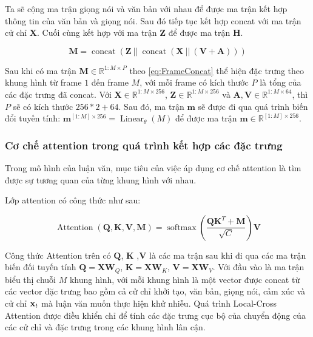 Ta sẽ cộng ma trận giọng nói và văn bản với nhau để được ma trận kết hợp thông tin của văn bản và giọng nói. Sau đó tiếp tục kết hợp concat với ma trận cử chỉ $\mathbf{X}$. Cuối cùng kết hợp với ma trận $\mathbf{Z}$ để được ma trận $\mathbf{H}$.

\begin{equation}
	\label{eq:FrameConcat}
	\mathbf{M} = \operatorname{concat}( \mathbf{Z}\  || \   \operatorname{concat}(\mathbf{X}\ || \  (\mathbf{V} + \mathbf{A}) ) )
\end{equation}

Sau khi có ma trận $\mathbf{M} \in \mathbb{R}^{1:M \times P}$ theo \autoref{eq:FrameConcat} thể hiện đặc trưng theo khung hình từ frame $1$ đến frame $M$, với mỗi frame có kích thước $P$ là tổng của các đặc trưng đã concat. Với $\mathbf{X} \in \mathbb{R}^{1:M \times 256}$, $\mathbf{Z} \in \mathbb{R}^{1:M \times 256}$ và $\mathbf{A}, \mathbf{V} \in \mathbb{R}^{1:M \times 64}$, thì $P$ sẽ có kích thước $256 * 2 + 64$. Sau đó, ma trận $\mathbf{m}$ sẽ được đi qua quá trình biến đổi tuyến tính: $\mathbf{m}^{[1:M] \times 256} = \operatorname{Linear}_{\theta}(M)$ để được ma trận $\mathbf{m} \in \mathbb{R}^{[1:M] \times 256}$.

\subsubsection{Cơ chế attention trong quá trình kết hợp các đặc trưng}

Trong mô hình của luận văn, mục tiêu của việc áp dụng cơ chế attention là tìm được sự tương quan của từng khung hình với nhau.

Lớp attention có công thức như sau:

\begin{equation} \label{eq:attention}
	\operatorname{Attention}(\mathbf{Q}, \mathbf{K}, \mathbf{V}, \mathbf{M})=\operatorname{softmax}\left(\frac{\mathbf{Q} \mathbf{K}^{T}+\mathbf{M}}{\sqrt{C}}\right) \mathbf{V}
\end{equation}

Công thức Attention trên có $\mathbf{Q}$, $\mathbf{K}$ ,$\mathbf{V}$ là các ma trận sau khi đi qua các ma trận biến đối tuyến tính $\mathbf{Q} = \mathbf{X} \mathbf{W}_Q$, $\mathbf{K} = \mathbf{X} \mathbf{W}_K$, $\mathbf{V} = \mathbf{X} \mathbf{W}_V$. Với đầu vào là ma trận biểu thị chuỗi $M$ khung hình, với mỗi khung hình là một vector được concat từ các vector đặc trưng bao gồm cả cử chỉ khởi tạo, văn bản, giọng nói, cảm xúc và cử chỉ $\mathbf{x}_t$ mà luận văn muốn thực hiện khử nhiễu. Quá trình Local-Cross Attention được điều khiển chỉ để tính các đặc trưng cục bộ của chuyển động của các cử chỉ và đặc trưng trong các khung hình lân cận.

